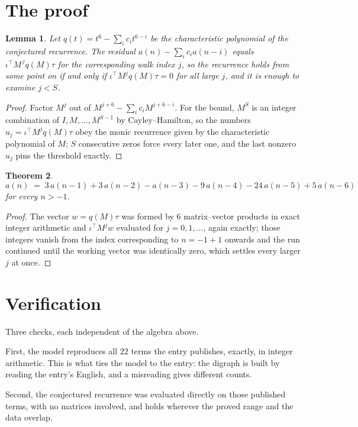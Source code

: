 \documentclass[11pt,a4paper]{article}
\theoremstyle{plain}
\newtheorem{theorem}{Theorem}
\newtheorem{lemma}[theorem]{Lemma}
\theoremstyle{definition}
\begin{document}
\section{The proof}

\begin{lemma}\label{lem:crit}
Let $q(t)=t^{6}-\sum_i c_it^{6-i}$ be the characteristic polynomial of the
conjectured recurrence. The residual $a(n)-\sum_ic_ia(n-i)$ equals
$\iota^{\!\top}M^{\,j}q(M)\tau$ for the corresponding walk index $j$, so the recurrence
holds from some point on if and only if $\iota^{\!\top}M^{j}q(M)\tau=0$ for all large $j$,
and it is enough to examine $j<S$.
\end{lemma}

\begin{proof}
Factor $M^{j}$ out of $M^{j+6}-\sum_ic_iM^{j+6-i}$. For the bound, $M^{S}$
is an integer combination of $I,M,\dots,M^{S-1}$ by Cayley--Hamilton, so the numbers
$u_j=\iota^{\!\top}M^{j}q(M)\tau$ obey the monic recurrence given by the characteristic
polynomial of $M$; $S$ consecutive zeros force every later one, and the last nonzero $u_j$
pins the threshold exactly.
\end{proof}

\begin{theorem}
\[
a(n)\;=\;3\,a(n-1) + 3\,a(n-2) - a(n-3) - 9\,a(n-4) - 24\,a(n-5) + 5\,a(n-6)
\]
for every $n>-1$.
\end{theorem}

\begin{proof}
The vector $w=q(M)\tau$ was formed by $6$ matrix--vector products in exact integer
arithmetic and $\iota^{\!\top}M^{j}w$ evaluated for $j=0,1,\dots$, again exactly; those
integers vanish from the index corresponding to $n=-1+1$ onwards and the run continued
until the working vector was identically zero, which settles every larger $j$ at once.
\end{proof}

\section{Verification}

Three checks, each independent of the algebra above.

First, the model reproduces all $22$ terms the entry publishes, exactly, in integer
arithmetic. This is what ties the model to the entry: the digraph is built by reading the
entry's English, and a misreading gives different counts.

Second, the conjectured recurrence was evaluated directly on those published terms, with no
matrices involved, and holds wherever the proved range and the data overlap.
\end{document}
